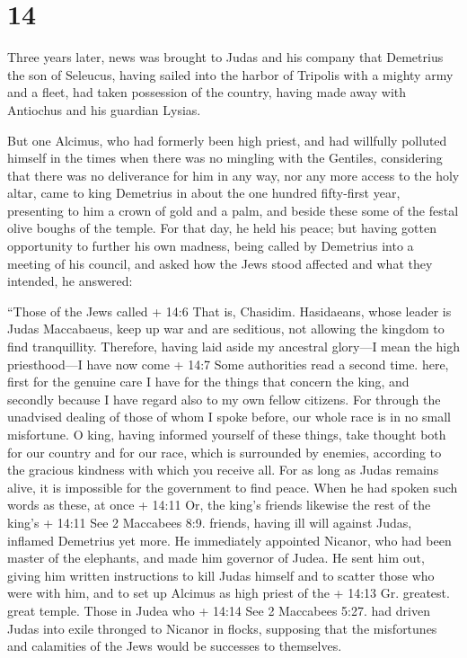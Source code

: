 \hypertarget{section-12}{%
\section{14}\label{section-12}}

 Three years later, news was brought to Judas and his
company that Demetrius the son of Seleucus, having sailed into the
harbor of Tripolis with a mighty army and a fleet,  had
taken possession of the country, having made away with Antiochus and his
guardian Lysias.

 But one Alcimus, who had formerly been high priest, and had
willfully polluted himself in the times when there was no mingling with
the Gentiles, considering that there was no deliverance for him in any
way, nor any more access to the holy altar,  came to king
Demetrius in about the one hundred fifty-first year, presenting to him a
crown of gold and a palm, and beside these some of the festal olive
boughs of the temple. For that day, he held his peace;  but
having gotten opportunity to further his own madness, being called by
Demetrius into a meeting of his council, and asked how the Jews stood
affected and what they intended, he answered:

 ``Those of the Jews called + 14:6 That is, Chasidim.
Hasidaeans, whose leader is Judas Maccabaeus, keep up war and are
seditious, not allowing the kingdom to find tranquillity. 
Therefore, having laid aside my ancestral glory---I mean the high
priesthood---I have now come + 14:7 Some authorities read a second time.
here,  first for the genuine care I have for the things that
concern the king, and secondly because I have regard also to my own
fellow citizens. For through the unadvised dealing of those of whom I
spoke before, our whole race is in no small misfortune.  O
king, having informed yourself of these things, take thought both for
our country and for our race, which is surrounded by enemies, according
to the gracious kindness with which you receive all.  For
as long as Judas remains alive, it is impossible for the government to
find peace.  When he had spoken such words as these, at
once + 14:11 Or, the king's friends likewise the rest of the king's +
14:11 See 2 Maccabees 8:9. friends, having ill will against Judas,
inflamed Demetrius yet more.  He immediately appointed
Nicanor, who had been master of the elephants, and made him governor of
Judea. He sent him out,  giving him written instructions to
kill Judas himself and to scatter those who were with him, and to set up
Alcimus as high priest of the + 14:13 Gr. greatest. great temple.
 Those in Judea who + 14:14 See 2 Maccabees 5:27. had
driven Judas into exile thronged to Nicanor in flocks, supposing that
the misfortunes and calamities of the Jews would be successes to
themselves.

